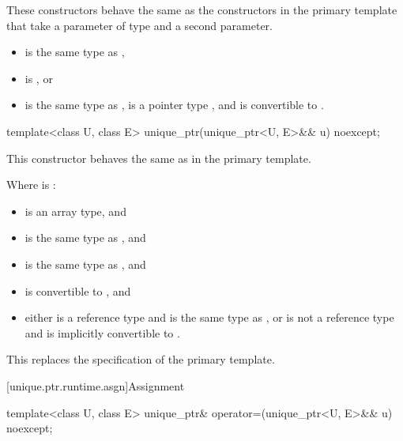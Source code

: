 \begin{itemdescr}
\pnum
These constructors behave the same as
the constructors in the primary template that
take a parameter of type  and a second parameter.

\pnum
\constraints
\begin{itemize}
\item {} is the same type as ,
\item {} is , or
\item {} is the same type as ,
       is a pointer type , and
       is convertible to .
\end{itemize}
\end{itemdescr}

%
\begin{itemdecl}
template<class U, class E> unique_ptr(unique_ptr<U, E>&& u) noexcept;
\end{itemdecl}

\begin{itemdescr}
\pnum
This constructor behaves the same as in the primary template.

\pnum
\constraints
Where  is :
\begin{itemize}
\item {} is an array type, and
\item {} is the same type as , and
\item {} is the same type as , and
\item {} is convertible to , and
\item either  is a reference type and  is the same type as ,
      or  is not a reference type and  is implicitly convertible to .
\end{itemize}

\begin{note}
This replaces the \constraints specification of the primary template.
\end{note}
\end{itemdescr}

[unique.ptr.runtime.asgn]{Assignment}

%
\begin{itemdecl}
template<class U, class E> unique_ptr& operator=(unique_ptr<U, E>&& u) noexcept;
\end{itemdecl}

